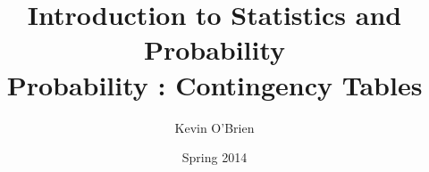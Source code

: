 \documentclass[a4]{beamer}
\title[Stats-Lab.com]{\LARGE Introduction to Statistics and Probability \\ {\Large Probability : Contingency Tables}}
\author[Kevin O'Brien]{Kevin O'Brien}
\date{Spring 2014}
\begin{document}
\begin{frame}
\titlepage
\end{frame}





\end{document}
